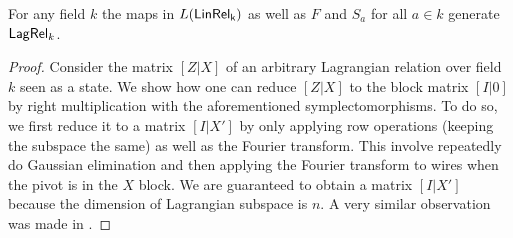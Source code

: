 \begin{theorem}
\label{theorem:generators}
For any field $k$ the maps in $L(\sf LinRel_k)$ as well as $F$ and $S_a$ for all $a \in k$ generate $\mathsf{Lag}\mathsf{Rel}_k$.
\end{theorem}

\begin{proof}
Consider the matrix $[Z|X]$ of an arbitrary Lagrangian relation over field $k$ seen as a state.
%
We show how one can reduce $[Z|X]$ to the block matrix $[I|0]$ by right multiplication with the aforementioned symplectomorphisms.
To do so, we first reduce it to a matrix $[I|X']$
by only applying row operations (keeping the subspace the same) as well as the Fourier transform.
This involve repeatedly do Gaussian elimination and then applying the Fourier transform to wires when the pivot is in the $X$ block.
We are guaranteed to obtain a matrix $[I|X']$ because the dimension of Lagrangian subspace is $n$.
A very similar observation was made in \cite[Lem. 6]{aaronson}.


\end{proof}
